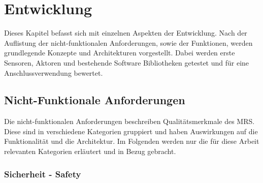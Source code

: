 \section{Entwicklung}
\label{sec:entwicklung}
Dieses Kapitel befasst sich mit einzelnen Aspekten der Entwicklung. Nach der Auflistung der nicht-funktionalen Anforderungen, sowie der Funktionen, werden grundlegende Konzepte und Architekturen vorgestellt. Dabei werden erste Sensoren, Aktoren und bestehende Software Bibliotheken getestet und für eine Anschlussverwendung bewertet.

\subsection{Nicht-Funktionale Anforderungen}
\label{sec:dev-nichtfunk}

Die nicht-funktionalen Anforderungen beschreiben Qualitätsmerkmale des MRS. Diese sind in verschiedene Kategorien gruppiert und haben Auswirkungen auf die Funktionalität und die Architektur. Im Folgenden werden nur die für diese Arbeit relevanten Kategorien erläutert und in Bezug gebracht.

\subsubsection{Sicherheit - Safety}

